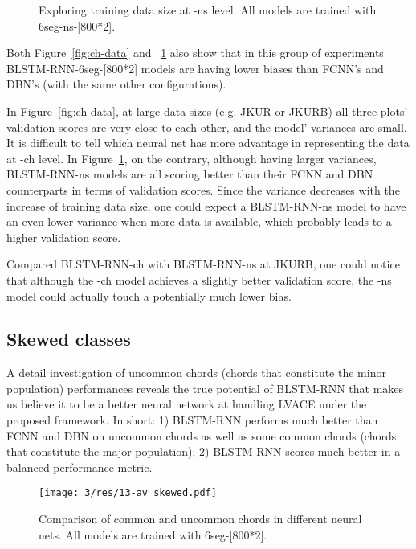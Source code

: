 \begin{figure}[htb]
{
	}
	\caption{Exploring training data size at -ns level. All models are trained with 6seg-ns-[800*2].}
	\label{fig:ns-data}
\end{figure}

Both Figure~\ref{fig:ch-data} and ~\ref{fig:ns-data} also show that in this group of experiments BLSTM-RNN-6seg-[800*2] models are having lower biases than FCNN's and DBN's (with the same other configurations).

In Figure~\ref{fig:ch-data}, at large data sizes (e.g. JKUR or JKURB) all three plots' validation scores are very close to each other, and the model' variances are small. It is difficult to tell which neural net has more advantage in representing the data at -ch level. In Figure~\ref{fig:ns-data}, on the contrary, although having larger variances, BLSTM-RNN-ns models are all scoring better than their FCNN and DBN counterparts in terms of validation scores. Since the variance decreases with the increase of training data size, one could expect a BLSTM-RNN-ns model to have an even lower variance when more data is available, which probably leads to a higher validation score.

Compared BLSTM-RNN-ch with BLSTM-RNN-ns at JKURB, one could notice that although the -ch model achieves a slightly better validation score, the -ns model could actually touch a potentially much lower bias. %

\subsection{Skewed classes}\label{sec:3-p7}

A detail investigation of uncommon chords (chords that constitute the minor population) performances reveals the true potential of BLSTM-RNN that makes us believe it to be a better neural network at handling LVACE under the proposed framework. In short: 1) BLSTM-RNN performs much better than FCNN and DBN on uncommon chords as well as some common chords (chords that constitute the major population); 2) BLSTM-RNN scores much better in a balanced performance metric.
\begin{figure}[htb]
	\centering
    \texttt{[image: 3/res/13-av\_skewed.pdf]}
	\caption{Comparison of common and uncommon chords in different neural nets. All models are trained with 6seg-[800*2].}
	\label{fig:blstm-long-tail}
\end{figure}

